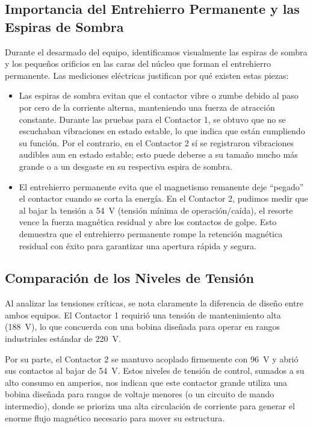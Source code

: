 \subsection{Importancia del Entrehierro Permanente y las Espiras de Sombra}
Durante el desarmado del equipo, identificamos visualmente las espiras de sombra y los pequeños orificios en las caras del núcleo que forman el entrehierro permanente. Las mediciones eléctricas justifican por qué existen estas piezas:
\begin{itemize}
    \item Las espiras de sombra evitan que el contactor vibre o zumbe debido al paso por cero de la corriente alterna, manteniendo una fuerza de atracción constante. Durante las pruebas para el Contactor 1, se obtuvo que no se escuchaban vibraciones en estado estable, lo que indica que están cumpliendo su función. Por el contrario, en el Contactor 2 sí se registraron vibraciones audibles aun en estado estable; esto puede deberse a su tamaño mucho más grande o a un desgaste en su respectiva espira de sombra.
    \item El entrehierro permanente evita que el magnetismo remanente deje ``pegado'' el contactor cuando se corta la energía. En el Contactor 2, pudimos medir que al bajar la tensión a \qty{54}{\volt} (tensión mínima de operación/caída), el resorte vence la fuerza magnética residual y abre los contactos de golpe. Esto demuestra que el entrehierro permanente rompe la retención magnética residual con éxito para garantizar una apertura rápida y segura.
\end{itemize}

\subsection{Comparación de los Niveles de Tensión}
Al analizar las tensiones críticas, se nota claramente la diferencia de diseño entre ambos equipos. El Contactor 1 requirió una tensión de mantenimiento alta (\qty{188}{\volt}), lo que concuerda con una bobina diseñada para operar en rangos industriales estándar de \qty{220}{\volt}.

Por su parte, el Contactor 2 se mantuvo acoplado firmemente con \qty{96}{\volt} y abrió sus contactos al bajar de \qty{54}{\volt}. Estos niveles de tensión de control, sumados a su alto consumo en amperios, nos indican que este contactor grande utiliza una bobina diseñada para rangos de voltaje menores (o un circuito de mando intermedio), donde se prioriza una alta circulación de corriente para generar el enorme flujo magnético necesario para mover su estructura.

